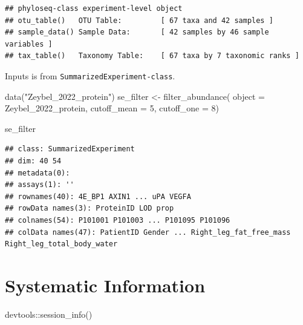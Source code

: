 \documentclass[
]{book}
\newenvironment{Shaded}{\begin{snugshade}}{\end{snugshade}}
\newcommand{\AttributeTok}[1]{\textcolor[rgb]{0.77,0.63,0.00}{#1}}
\newcommand{\DecValTok}[1]{\textcolor[rgb]{0.00,0.00,0.81}{#1}}
\newcommand{\FunctionTok}[1]{\textcolor[rgb]{0.00,0.00,0.00}{#1}}
\newcommand{\NormalTok}[1]{#1}
\newcommand{\OtherTok}[1]{\textcolor[rgb]{0.56,0.35,0.01}{#1}}
\newcommand{\SpecialCharTok}[1]{\textcolor[rgb]{0.00,0.00,0.00}{#1}}
\newcommand{\StringTok}[1]{\textcolor[rgb]{0.31,0.60,0.02}{#1}}
\begin{document}
\begin{verbatim}
## phyloseq-class experiment-level object
## otu_table()   OTU Table:         [ 67 taxa and 42 samples ]
## sample_data() Sample Data:       [ 42 samples by 46 sample variables ]
## tax_table()   Taxonomy Table:    [ 67 taxa by 7 taxonomic ranks ]
\end{verbatim}

Inputs is from \texttt{SummarizedExperiment-class}.

\begin{Shaded}
\begin{Highlighting}[]
\FunctionTok{data}\NormalTok{(}\StringTok{"Zeybel\_2022\_protein"}\NormalTok{)}
\NormalTok{se\_filter }\OtherTok{\textless{}{-}} \FunctionTok{filter\_abundance}\NormalTok{(}
  \AttributeTok{object =}\NormalTok{ Zeybel\_2022\_protein,}
  \AttributeTok{cutoff\_mean =} \DecValTok{5}\NormalTok{,}
  \AttributeTok{cutoff\_one =} \DecValTok{8}\NormalTok{)}

\NormalTok{se\_filter}
\end{Highlighting}
\end{Shaded}

\begin{verbatim}
## class: SummarizedExperiment 
## dim: 40 54 
## metadata(0):
## assays(1): ''
## rownames(40): 4E_BP1 AXIN1 ... uPA VEGFA
## rowData names(3): ProteinID LOD prop
## colnames(54): P101001 P101003 ... P101095 P101096
## colData names(47): PatientID Gender ... Right_leg_fat_free_mass Right_leg_total_body_water
\end{verbatim}

\hypertarget{systematic-information}{%
\section{Systematic Information}\label{systematic-information}}

\begin{Shaded}
\begin{Highlighting}[]
\NormalTok{devtools}\SpecialCharTok{::}\FunctionTok{session\_info}\NormalTok{()}
\end{Highlighting}
\end{Shaded}
\end{document}
